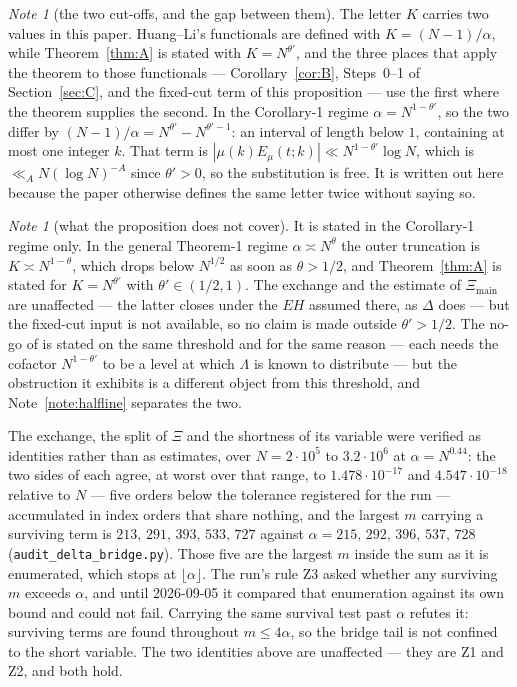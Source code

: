 \documentclass[11pt,a4paper]{article}
\theoremstyle{plain}
\theoremstyle{definition}
\theoremstyle{remark}
\newtheorem{note}[theorem]{Note}
\newcommand{\Emu}{E_\mu}
\begin{document}
\begin{note}[the two cut-offs, and the gap between them]
The letter $K$ carries two values in this paper. Huang--Li's
functionals are defined with $K=(N-1)/\alpha$, while
Theorem~\ref{thm:A} is stated with $K=N^{\theta'}$, and the three
places that apply the theorem to those functionals ---
Corollary~\ref{cor:B}, Steps~0--1 of Section~\ref{sec:C}, and the
fixed-cut term of this proposition --- use the first where the theorem
supplies the second. In the Corollary-1 regime $\alpha=N^{1-\theta'}$,
so the two differ by $(N-1)/\alpha=N^{\theta'}-N^{\theta'-1}$: an
interval of length below $1$, containing at most one integer $k$. That
term is $|\mu(k)\Emu(t;k)|\ll N^{1-\theta'}\log N$, which is
$\ll_AN(\log N)^{-A}$ since $\theta'>0$, so the substitution is free.
It is written out here because the paper otherwise defines the same
letter twice without saying so.
\end{note}

\begin{note}[what the proposition does not cover]
It is stated in the Corollary-1 regime only. In the general Theorem-1
regime $\alpha\asymp N^{\theta}$ the outer truncation is
$K\asymp N^{1-\theta}$, which drops below $N^{1/2}$ as soon as
$\theta>1/2$, and Theorem~\ref{thm:A} is stated for $K=N^{\theta'}$
with $\theta'\in(1/2,1)$. The exchange and the estimate of
$\Xi_{\mathrm{main}}$ are unaffected --- the latter closes under the
$EH$ assumed there, as $\Delta$ does --- but the fixed-cut input is not
available, so no claim is made outside $\theta'>1/2$. The no-go of
\cite{P2} is stated on the same threshold and for the same reason ---
each needs the cofactor $N^{1-\theta'}$ to be a level at which
$\Lambda$ is known to distribute --- but the obstruction it exhibits
is a different object from this threshold, and
Note~\ref{note:halfline} separates the two.
\end{note}

The exchange, the split of $\Xi$ and the shortness of its variable were
verified as identities rather than as estimates, over
$N=2\cdot10^5$ to $3.2\cdot10^6$ at $\alpha=N^{0.44}$: the two sides of
each agree, at worst over that range, to $1.478\cdot10^{-17}$ and
$4.547\cdot10^{-18}$ relative to $N$ --- five orders below the
tolerance registered for the run --- accumulated in index orders that
share nothing, and the largest
$m$ carrying a surviving term is $213,\,291,\,393,\,533,\,727$ against
$\alpha=215,\,292,\,396,\,537,\,728$
(\texttt{audit\_delta\_bridge.py}). Those five are the
largest $m$ inside the sum as it is enumerated, which stops at
$\lfloor\alpha\rfloor$. The run's rule Z3 asked whether any
surviving $m$ exceeds $\alpha$, and until 2026-09-05 it
compared that enumeration against its own bound and could not
fail. Carrying the same survival test past $\alpha$ refutes
it: surviving terms are found throughout $m\le4\alpha$, so
the bridge tail is not confined to the short variable. The two
identities above are unaffected --- they are Z1 and Z2, and both
hold.
\end{document}
